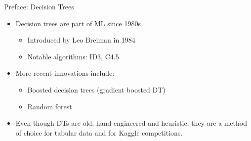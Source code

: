 \begin{frame}{Preface: Decision Trees}
    \begin{itemize}
        \item Decision trees are part of ML since 1980s
        \begin{itemize}
            \item Introduced by Leo Breiman in 1984
            \item Notable algorithms: ID3, C4.5
        \end{itemize}
        \item More recent innovations include:
        \begin{itemize}
            \item Boosted decision trees (gradient boosted DT)
            \item Random forest
        \end{itemize}
        \item Even though DTs are old, hand-engineered and heuristic, they are a method of choice for tabular data and for Kaggle competitions. 🙂
    \end{itemize}
\end{frame}


